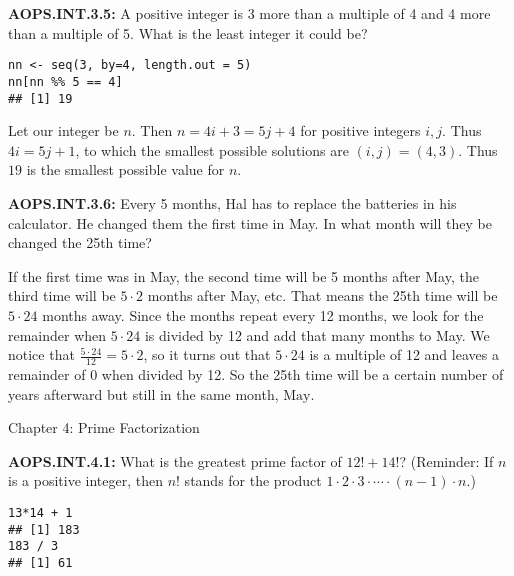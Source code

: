 \documentclass[11pt]{article}
\newenvironment{uzdevums}[1][\unskip]{%
\vspace{3mm}
\noindent
\textbf{#1:}
\noindent}
{}
\begin{document}
\begin{uzdevums}[AOPS.INT.3.5]
A positive integer is 3 more than a multiple of 4 and 4 more than a multiple of 5. What is the least integer it could be?
\end{uzdevums}

\begin{verbatim}
nn <- seq(3, by=4, length.out = 5)
nn[nn %% 5 == 4]
## [1] 19
\end{verbatim}

Let our integer be $n$. Then $n = 4i + 3 = 5j + 4$ for positive integers $i,j$. 
Thus $4i = 5j + 1$, to which the smallest possible solutions are $(i,j) = (4,3)$. 
Thus $\boxed{19}$ is the smallest possible value for $n$.




\begin{uzdevums}[AOPS.INT.3.6]
Every 5 months, Hal has to replace the batteries in his calculator. He changed them the first time in May. In what month will they be changed the 25th time?
\end{uzdevums}

If the first time was in May, the second time will be 5 months after May, the third time will be $5\cdot2$ months after May, etc. That means the 25th time will be $5\cdot24$ months away. Since the months repeat every 12 months, we look for the remainder when $5\cdot24$ is divided by 12 and add that many months to May. We notice that $\frac{5\cdot24}{12}=5\cdot2$, so it turns out that $5\cdot24$ is a multiple of 12 and leaves a remainder of 0 when divided by 12. So the 25th time will be a certain number of years afterward but still in the same month, $\boxed{\text{May}}$.





\vspace{30px}
\begin{center}
{\large Chapter 4: Prime Factorization}
\end{center}

\begin{uzdevums}[AOPS.INT.4.1]
What is the greatest prime factor of $12! + 14!$? (Reminder: If $n$ is a positive integer, then $n!$ stands for the product $1\cdot 2\cdot 3\cdot \cdots \cdot (n-1)\cdot n$.)
\end{uzdevums}

\begin{verbatim}
13*14 + 1
## [1] 183
183 / 3
## [1] 61
\end{verbatim}
\end{document}
